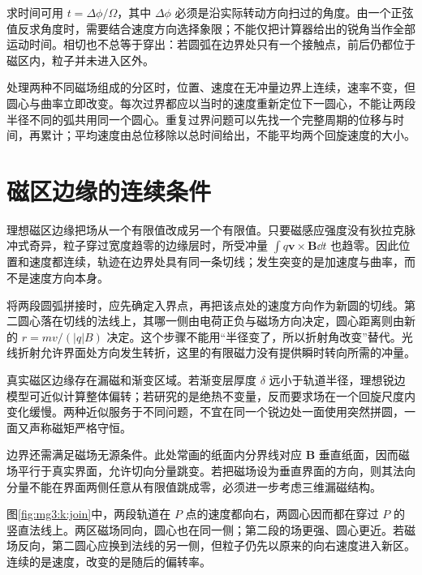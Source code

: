求时间可用 $t=\Delta\phi/\Omega$，其中 $\Delta\phi$ 必须是沿实际转动方向扫过的角度。由一个正弦值反求角度时，需要结合速度方向选择象限；不能仅把计算器给出的锐角当作全部运动时间。相切也不总等于穿出：若圆弧在边界处只有一个接触点，前后仍都位于磁区内，粒子并未进入区外。


处理两种不同磁场组成的分区时，位置、速度在无冲量边界上连续，速率不变，但圆心与曲率立即改变。每次过界都应以当时的速度重新定位下一圆心，不能让两段半径不同的弧共用同一个圆心。重复过界问题可以先找一个完整周期的位移与时间，再累计；平均速度由总位移除以总时间给出，不能平均两个回旋速度的大小。




\section{磁区边缘的连续条件}
理想磁区边缘把场从一个有限值改成另一个有限值。只要磁感应强度没有狄拉克脉冲式奇异，粒子穿过宽度趋零的边缘层时，所受冲量 $\int q\bm v\times\bm B\dd t$ 也趋零。因此位置和速度都连续，轨迹在边界处具有同一条切线；发生突变的是加速度与曲率，而不是速度方向本身。


将两段圆弧拼接时，应先确定入界点，再把该点处的速度方向作为新圆的切线。第二圆心落在切线的法线上，其哪一侧由电荷正负与磁场方向决定，圆心距离则由新的 $r=mv/(|q|B)$ 决定。这个步骤不能用“半径变了，所以折射角改变”替代。光线折射允许界面处方向发生转折，这里的有限磁力没有提供瞬时转向所需的冲量。


真实磁区边缘存在漏磁和渐变区域。若渐变层厚度 $\delta$ 远小于轨道半径，理想锐边模型可近似计算整体偏转；若研究的是绝热不变量，反而要求场在一个回旋尺度内变化缓慢。两种近似服务于不同问题，不宜在同一个锐边处一面使用突然拼圆，一面又声称磁矩严格守恒。


边界还需满足磁场无源条件。此处常画的纸面内分界线对应 $\bm B$ 垂直纸面，因而磁场平行于真实界面，允许切向分量跳变。若把磁场设为垂直界面的方向，则其法向分量不能在界面两侧任意从有限值跳成零，必须进一步考虑三维漏磁结构。

图\ref{fig:mg3:k:join}中，两段轨道在 $P$ 点的速度都向右，两圆心因而都在穿过 $P$ 的竖直法线上。两区磁场同向，圆心也在同一侧；第二段的场更强、圆心更近。若磁场反向，第二圆心应换到法线的另一侧，但粒子仍先以原来的向右速度进入新区。连续的是速度，改变的是随后的偏转率。



